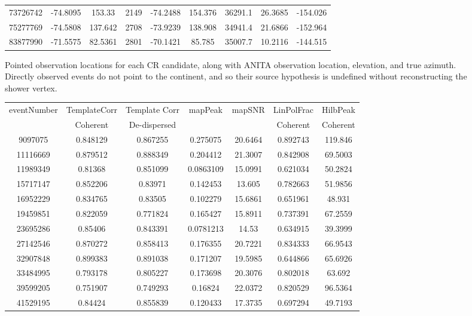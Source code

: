 \begin{figure}
\begin{tabular}{|c|c|c|c|c|c|c|c|l|}
	73726742 &	-74.8095 &	153.33	&	2149&	-74.2488&	154.376	&	36291.1	&	26.3685	&	-154.026 \\
	75277769 &	-74.5808 &	137.642	&	2708&	-73.9239&	138.908	&	34941.4	&	21.6866	&	-152.964 \\
	83877990 &	-71.5575 &	82.5361	&	2801&	-70.1421&	85.785	&	35007.7	&	10.2116	&	-144.515 \\
	\hline
	\end{tabular}
	\caption{Pointed observation locations for each CR candidate, along with ANITA observation location, elevation, and true azimuth.  Directly observed events do not point to the continent, and so their source hypothesis is undefined without reconstructing the shower vertex.}
	\label{tab:eventLocations}
	\end{figure}
	
	
	\begin{figure}
	\centering
	\begin{tabular}{|c|c|c|c|c|c|c|}
	\hline
	eventNumber	& TemplateCorr	&	Template Corr	&	mapPeak	&	mapSNR	&	LinPolFrac	& HilbPeak \\
				&	Coherent	&	De-dispersed	&			&			&	Coherent	&	Coherent \\
	\hline
	9097075	&	0.848129	&	0.867255	&	0.275075	&	20.6464	&	0.892743	&	119.846 \\
	11116669	&	0.879512	&	0.888349	&	0.204412	&	21.3007	&	0.842908	&	69.5003 \\
	11989349	&	0.81368	&	0.851099	&	0.0863109	&	15.0991	&	0.621034	&	50.2824 \\ 
	15717147	&	0.852206	&	0.83971	&	0.142453	&	13.605	&	0.782663	&	51.9856 \\
	16952229	&	0.834765	&	0.83505	&	0.102279	&	15.6861	&	0.651961	&	48.931 \\
	19459851	&	0.822059	&	0.771824	&	0.165427	&	15.8911	&	0.737391	&	67.2559 \\
	23695286	&	0.85406	&	0.843391	&	0.0781213	&	14.53	&	0.634915	&	39.3999 \\ 
	27142546	&	0.870272	&	0.858413	&	0.176355	&	20.7221	&	0.834333	&	66.9543 \\
	32907848	&	0.899383	&	0.891038	&	0.171207	&	19.5985	&	0.644866	&	65.6926 \\
	33484995	&	0.793178	&	0.805227	&	0.173698	&	20.3076	&	0.802018	&	63.692 \\
	39599205	&	0.751907	&	0.749293	&	0.16824	&	22.0372	&	0.820529	&	96.5364 \\
	41529195	&	0.84424	&	0.855839	&	0.120433	&	17.3735	&	0.697294	&	49.7193 \\

\end{tabular}
\end{figure}
